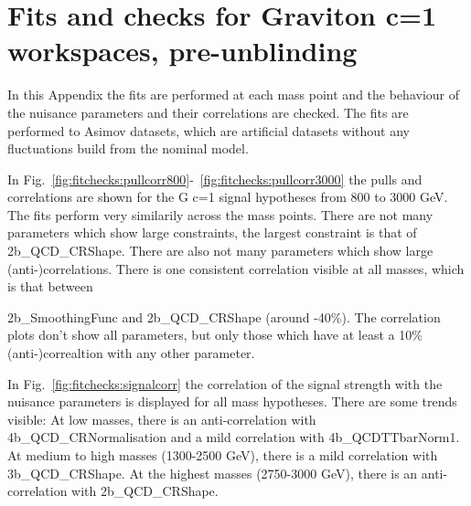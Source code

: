 \section{Fits and checks for Graviton c=1 workspaces, pre-unblinding}
\label{app:fitchecks}

In this Appendix the fits are performed at each mass point and the behaviour of the nuisance parameters and their correlations are checked.
The fits are performed to Asimov datasets, which are artificial datasets without any fluctuations build from the nominal model.

In Fig.~\ref{fig:fitchecks:pullcorr800}-~\ref{fig:fitchecks:pullcorr3000} the pulls and correlations are shown for the G c=1 signal hypotheses from 800 to 3000 GeV. The fits perform very similarily across the mass points. There are not many parameters which show large constraints, the largest constraint is that of 2b{\_}QCD{\_}CRShape. There are also not many parameters which show large (anti-)correlations. There is one consistent correlation visible at all masses, which is that between {2b{\_}SmoothingFunc and 2b{\_}QCD{\_}CRShape (around -40\%). The correlation plots don't show all parameters, but only those which have at least a 10\% (anti-)correaltion with any other parameter.

In Fig.~\ref{fig:fitchecks:signalcorr} the correlation of the signal strength with the nuisance parameters is displayed for all mass hypotheses. There are some trends visible: At low masses, there is an anti-correlation with 4b{\_}QCD{\_}CRNormalisation and a mild correlation with 4b{\_}QCDTTbarNorm1. At medium to high masses (1300-2500 GeV), there is a mild correlation with 3b{\_}QCD{\_}CRShape. At the highest masses (2750-3000 GeV), there is an anti-correlation with 2b{\_}QCD{\_}CRShape.

}
